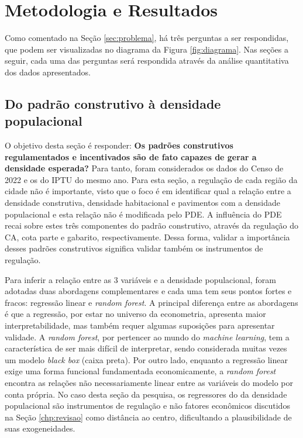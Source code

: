 \chapter{Metodologia e Resultados}
\label{chp:analise}

Como comentado na Seção \ref{sec:problema}, há três perguntas a ser respondidas, que podem ser visualizadas no diagrama da Figura \ref{fig:diagrama}. Nas seções a seguir, cada uma das perguntas será respondida através da análise quantitativa dos dados apresentados.


\section{Do padrão construtivo à densidade populacional}
\label{sec:perg1}


O objetivo desta seção é responder: \textbf{Os padrões construtivos regulamentados e incentivados são de fato capazes de gerar a densidade esperada?} Para tanto, foram considerados os dados do Censo de 2022 e os do IPTU do mesmo ano. Para esta seção, a regulação de cada região da cidade não é importante, visto que o foco é em identificar qual a relação entre a densidade construtiva, densidade habitacional e pavimentos com a densidade populacional e esta relação não é modificada pelo PDE. A influência do PDE recai sobre estes três componentes do padrão construtivo, através da regulação do CA, cota parte e gabarito, respectivamente. Dessa forma, validar a importância desses padrões construtivos significa validar também os instrumentos de regulação.

Para inferir a relação entre as 3 variáveis e a densidade populacional, foram adotadas duas abordagens complementares e cada uma tem seus pontos fortes e fracos: regressão linear e \textit{random forest}. A principal diferença entre as abordagens é que a regressão, por estar no universo da econometria, apresenta maior interpretabilidade, mas também requer algumas suposições para apresentar validade. A \textit{random forest}, por pertencer ao mundo do \textit{machine learning}, tem a característica de ser mais difícil de interpretar, sendo considerada muitas vezes um modelo \textit{black box} (caixa preta). Por outro lado, enquanto a regressão linear exige uma forma funcional fundamentada economicamente, a \textit{random forest} encontra as relações não necessariamente linear entre as variáveis do modelo por conta própria. No caso desta seção da pesquisa, os regressores do da densidade populacional são instrumentos de regulação e não fatores econômicos discutidos na Seção \ref{chp:revisao} como distância ao centro, dificultando a plausibilidade de suas exogeneidades.

